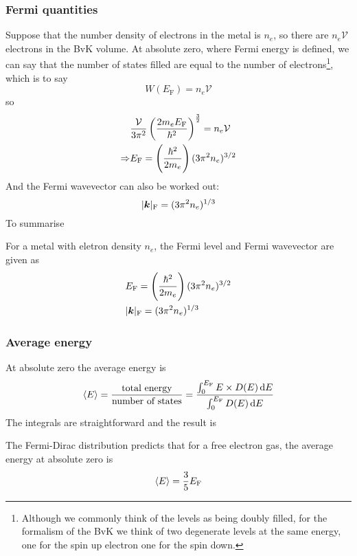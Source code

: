 \subsubsection{Fermi quantities}
Suppose that the number density of electrons in the metal is $n_e$, so there are $n_e\mathcal{V}$ electrons in the BvK volume. At absolute zero, where Fermi energy is defined, we can say that the number of states filled are equal to the number of electrons\footnote{Although we commonly think of the levels as being doubly filled, for the formalism of the BvK we think of two degenerate levels at the same energy, one for the spin up electron one for the spin down.}, which is to say
\begin{equation}
	W(E_{\mathrm{F}})=n_e\mathcal{V}
\end{equation}
so
\begin{equation}
\begin{aligned}
	&\frac{\mathcal{V}}{3\pi^2}\left(\frac{2m_eE_{\mathrm{F}}}{\hbar^2} \right)^{\frac{3}{2}}=n_e\mathcal{V}\\
	\Rightarrow&E_{\mathrm{F}}=\left(\frac{\hbar^2}{2m_e} \right)(3\pi^2n_e)^{3/2}
\end{aligned}
\end{equation}
And the Fermi wavevector can also be worked out:
\begin{equation}
	|\boldsymbol{k}|_{\mathrm{F}}=(3\pi^2n_e)^{1/3}
\end{equation}
To summarise
\begin{thrm}
For a metal with eletron density $n_e$, the Fermi level and Fermi wavevector are given as
\begin{equation}
\begin{aligned}
&E_{\mathrm{F}}=\left(\frac{\hbar^2}{2m_e} \right)(3\pi^2n_e)^{3/2}\\
&|\boldsymbol{k}|_{\mathrm{F}}=(3\pi^2n_e)^{1/3}
\end{aligned}
\end{equation}
\end{thrm}
\subsubsection{Average energy}
At absolute zero the average energy is
\begin{equation}
	\lgl E\rgl=\frac{\text{total energy}}{\text{number of states}}=\frac{\int^{E_\text{F}}_0E\times D(E)\dif E}{\int^{E_\text{F}}_0D(E)\dif E}
\end{equation}
The integrals are straightforward and the result is 
\begin{thrm}
The Fermi-Dirac distribution predicts that for a free electron gas, the average energy at absolute zero is
\begin{equation}
	\langle E\rangle=\frac{3}{5}E_{\mathrm{F}}
\end{equation}
\end{thrm}
